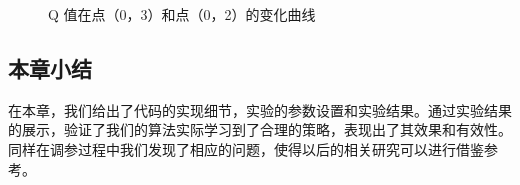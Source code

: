 \documentclass{standalone}
\begin{document}
\begin{figure}[h]
	\caption{Q 值在点（0，3）和点（0，2）的变化曲线}
	\label{fig2}
\end{figure}

\subsection{本章小结}
在本章，我们给出了代码的实现细节，实验的参数设置和实验结果。通过实验结果的展示，验证了我们的算法实际学习到了合理的策略，表现出了其效果和有效性。同样在调参过程中我们发现了相应的问题，使得以后的相关研究可以进行借鉴参考。
\end{document}
